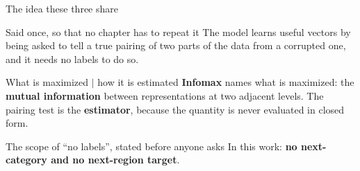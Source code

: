 \documentclass{beamer}
\begin{document}
%
\begin{frame}{The idea these three share}
    \begin{block}{Said once, so that no chapter has to repeat it}
        \small
        The model learns useful vectors by being asked to tell a true pairing of two parts of the
        data from a corrupted one, and it needs no labels to do so.
    \end{block}

    \begin{exampleblock}{What is maximized $\mid$ how it is estimated}
        \small
        \textbf{Infomax} names what is maximized: the \textbf{mutual information} between
        representations at two adjacent levels. The pairing test is the \textbf{estimator}, because
        the quantity is never evaluated in closed form.
    \end{exampleblock}

    \begin{alertblock}{The scope of ``no labels'', stated before anyone asks}
        \small
        In this work: \textbf{no next-category and no next-region target}.
    \end{alertblock}
\end{frame}
\end{document}
